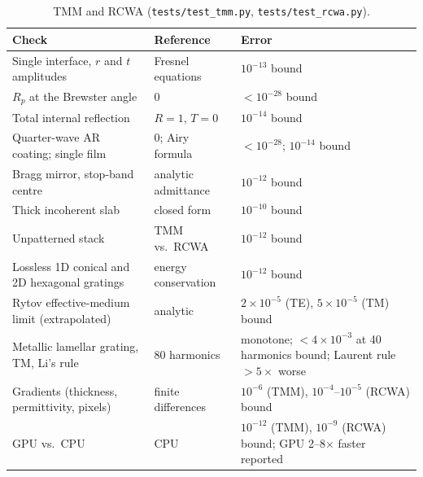 \documentclass[11pt]{article}
\newcommand{\code}[1]{\texttt{#1}}
\begin{document}
\begin{table}[ht]
\centering\small
\begin{tabularx}{\linewidth}{@{}Xll@{}}
\toprule
Check & Reference & Error \\
\midrule
Single interface, $r$ and $t$ amplitudes & Fresnel equations & $10^{-13}$ bound \\
$R_p$ at the Brewster angle & 0 & $<10^{-28}$ bound \\
Total internal reflection & $R=1$, $T=0$ & $10^{-14}$ bound \\
Quarter-wave AR coating; single film & 0; Airy formula & $<10^{-28}$; $10^{-14}$ bound \\
Bragg mirror, stop-band centre & analytic admittance & $10^{-12}$ bound \\
Thick incoherent slab & closed form & $10^{-10}$ bound \\
Unpatterned stack & TMM vs.\ RCWA & $10^{-12}$ bound \\
Lossless 1D conical and 2D hexagonal gratings & energy conservation & $10^{-12}$ bound \\
Rytov effective-medium limit (extrapolated) & analytic & $2\times10^{-5}$ (TE), $5\times10^{-5}$ (TM) bound \\
Metallic lamellar grating, TM, Li's rule & 80 harmonics & monotone; $<4\times10^{-3}$ at 40 harmonics bound; Laurent rule $>5\times$ worse \\
Gradients (thickness, permittivity, pixels) & finite differences & $10^{-6}$ (TMM), $10^{-4}$--$10^{-5}$ (RCWA) bound \\
GPU vs.\ CPU & CPU & $10^{-12}$ (TMM), $10^{-9}$ (RCWA) bound; GPU 2--8$\times$ faster reported \\
\bottomrule
\end{tabularx}
\caption{TMM and RCWA (\code{tests/test\_tmm.py}, \code{tests/test\_rcwa.py}).}
\label{tab:val-tmm}
\end{table}
\end{document}
